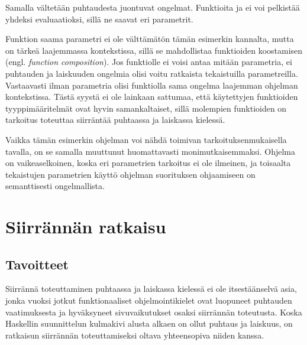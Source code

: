 \documentclass[finnish]{tktltiki2}
\begin{document}
Samalla vältetään puhtaudesta juontuvat ongelmat. Funktioita  ja 
ei voi pelkistää yhdeksi evaluaatioksi, sillä ne saavat eri parametrit.

Funktion  saama parametri  ei ole välttämätön tämän esimerkin kannalta,
mutta on tärkeä laajemmassa kontekstissa, sillä se mahdollistaa funktioiden koostamisen (engl.
\emph{function composition}). Jos funktiolle  ei voisi antaa mitään parametria, ei
puhtauden ja laiskuuden ongelmia olisi voitu ratkaista tekaistuilla parametreilla. Vastaavasti ilman
parametria  olisi funktiolla  sama ongelma laajemman ohjelman
kontekstissa. Tästä syystä ei ole lainkaan sattumaa, että käytettyjen funktioiden tyyppimääritelmät
ovat hyvin samankaltaiset, sillä molempien funktioiden on tarkoitus toteuttaa siirräntää puhtaassa
ja laiskassa kielessä.

Vaikka tämän esimerkin ohjelman voi nähdä toimivan tarkoituksenmukaisella tavalla, on se samalla
muuttunut huomattavasti monimutkaisemmaksi. Ohjelma on vaikeaselkoinen, koska eri parametrien
tarkoitus ei ole ilmeinen, ja toisaalta tekaistujen parametrien käyttö ohjelman suorituksen
ohjaamiseen on semanttisesti ongelmallista.


\section{Siirrännän ratkaisu} %

\subsection{Tavoitteet}


Siirrännä toteuttaminen puhtaassa ja laiskassa kielessä ei ole itsestäänselvä asia, jonka vuoksi
jotkut funktionaaliset ohjelmointikielet ovat luopuneet puhtauden vaatimuksesta ja hyväksyneet
sivuvaikutukset osaksi siirrännän toteutusta. Koska Haskellin suunnittelun kulmakivi alusta alkaen
on ollut puhtaus ja laiskuus, on ratkaisun siirrännän toteuttamiseksi oltava yhteensopiva niiden
kanssa.
\end{document}
